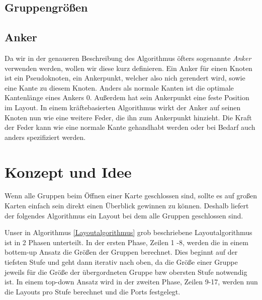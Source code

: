 



\subsection*{Gruppengrößen}


\subsection*{Anker}
Da wir in der genaueren Beschreibung des Algorithmus öfters sogenannte \textit{Anker} verwenden werden, wollen wir diese kurz definieren. 
Ein Anker für einen Knoten ist ein Pseudoknoten, ein Ankerpunkt, welcher also nich gerendert wird, sowie eine Kante zu diesem Knoten. 
Anders als normale Kanten ist die optimale Kantenlänge eines Ankers  0. Außerdem hat sein Ankerpunkt  eine feste Position im Layout. 
In einem kräftebasierten Algorithmus wirkt der Anker auf seinen Knoten nun wie eine weitere Feder, die ihn zum Ankerpunkt hinzieht.
Die Kraft der Feder kann wie eine normale Kante gehandhabt werden oder bei Bedarf auch anders spezifiziert werden.


\section{Konzept und Idee}
Wenn alle Gruppen beim Öffnen einer Karte geschlossen sind, sollte es auf großen Karten einfach sein direkt einen Überblick gewinnen zu können.
Deshalb liefert der folgendes Algorithmus ein Layout bei dem alle Gruppen geschlossen sind.

Unser in Algorithmus \ref{Layoutalgorithmus} grob beschriebene Layoutalgorithmus ist in 2 Phasen unterteilt. 
In der ersten Phase, Zeilen 1 -8, werden die in einem bottem-up Ansatz die Größen der Gruppen berechnet. 
Dies beginnt auf der tiefsten Stufe und geht dann iterativ nach oben, da die Größe einer Gruppe jeweils für die Größe der übergordneten Gruppe bzw obersten Stufe notwendig ist.
In einem top-down Ansatz wird in der zweiten Phase, Zeilen 9-17, werden nun die Layouts pro Stufe berechnet und die Ports festgelegt. 


